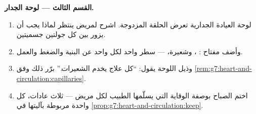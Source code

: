 \begin{problem}
\medskip\noindent\textbf{القسم الثالث --- لوحة الجدار.}
\begin{enumerate}[resume]
  \item لوحة العيادة الجدارية تعرض الحلقة المزدوجة. اشرح لمريض
        ينتظر لماذا يجب أن يزور   بين كل جولتين
        جسميتين.
  \item وأضف مفتاح : ، وشعيرة،  --- سطر واحد
        لكل واحد عن البنية والضغط والعمل.
  \item وذيل اللوحة يقول: ``كل علاج يخدم الشعيرات.'' برّر ذلك
        وفق \cref{rem:g7:heart-and-circulation:capillaries}.
  \item اختم الصباح بوصفة الوقاية التي يسلّمها الطبيب لكل مريض
        --- ثلاث عادات، كل واحدة مربوطة بآليتها في
        \cref{prop:g7:heart-and-circulation:keep}.
\end{enumerate}
\end{problem}
